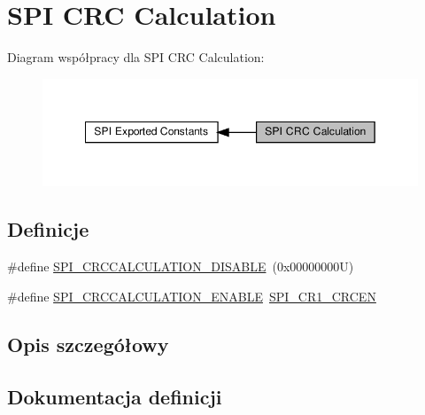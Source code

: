 \hypertarget{group___s_p_i___c_r_c___calculation}{}\section{S\+PI C\+RC Calculation}
\label{group___s_p_i___c_r_c___calculation}
Diagram współpracy dla S\+PI C\+RC Calculation\+:\nopagebreak
\begin{figure}[H]
\begin{center}
\leavevmode
\includegraphics[width=349pt]{group___s_p_i___c_r_c___calculation}
\end{center}
\end{figure}
\subsection*{Definicje}
\begin{DoxyCompactItemize}
\item 
\#define \hyperlink{group___s_p_i___c_r_c___calculation_ga9cd586b66473d7f207103a443280820e}{S\+P\+I\+\_\+\+C\+R\+C\+C\+A\+L\+C\+U\+L\+A\+T\+I\+O\+N\+\_\+\+D\+I\+S\+A\+B\+LE}~(0x00000000\+U)
\item 
\#define \hyperlink{group___s_p_i___c_r_c___calculation_ga431d368997c9c41e8923cbcd41b00123}{S\+P\+I\+\_\+\+C\+R\+C\+C\+A\+L\+C\+U\+L\+A\+T\+I\+O\+N\+\_\+\+E\+N\+A\+B\+LE}~\hyperlink{group___peripheral___registers___bits___definition_gac9339b7c6466f09ad26c26b3bb81c51b}{S\+P\+I\+\_\+\+C\+R1\+\_\+\+C\+R\+C\+EN}
\end{DoxyCompactItemize}


\subsection{Opis szczegółowy}


\subsection{Dokumentacja definicji}
\mbox{\label{group___s_p_i___c_r_c___calculation_ga9cd586b66473d7f207103a443280820e}} 
